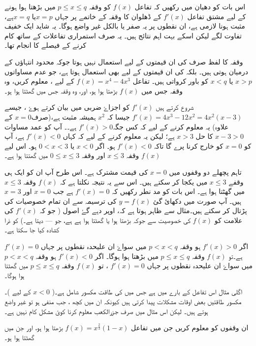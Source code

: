 اس بات کو دھیان میں رکھیں کہ تفاعل  \(f(x)\) کو وقفہ \(p \leq x \leq q\) میں بڑھتا ہوا ہونے کے لیے مشتق تفاعل \(f'(x)\) کے ڈھلوان کا وقفہ کے خاتمے پر جہاں \(x=p\)یا \(x=q\)ہے، مثبت ہونا لازمی ہے، ان نقطوں پر یہ صفر یا بالکل غیر واضع ہوگا۔ یہ شاید ایک خفیف تفاوت لگے لیکن اسکے بہت اہم نتائج ہیں۔ یہ صرف استمراری تفاعلات کے ساتھ کام کرنے کے فیصلے کا انجام تھا۔

وقفہ کا لفظ صرف   کی ان قیمتوں کے لیے استعمال نہیں ہوتا جوکہ محدود انتہاؤں کے درمیان ہوتی ہیں۔ بلکہ   کی ان قیمتوں کے لیے بھی استعمال ہوتا ہے، جو عدم مساواتوں \(x>p\) یا \(x<q\) کو باور کرواتی ہیں۔
تفاعل \(f(x)=x^4-4x^3\) کے لیے ، معلوم کریں، وہ وقفہ جس میں  \(f(x)\)  بڑھتا ہوا ہو، اور، وہ وقفہ جس میں گھٹتا ہوا ہو۔

شروع کرتے ہیں \(f'(x)\) کو اجزاۓ ضربی میں بیان کرتے ہوۓ ، جیسے \(f'(x)=4x^3-12x^2=4x^2(x-3)\) جیسا کہ \(x^2\) ہمیشہ مثبت ہے،(صرف\(x=0\) کے علاوہ) یہ معلوم کرنے کے لیے کہ کس جگہ\(f'(x)>0\) ہے۔۔ آپ کو عمد مساوات \(x-3>0\) کا حل \(x>3\) ہے؛ لیکن یہ معلوم کرنے کے لیے کہ کہاں \(f'(x)<0\) ہے، آپ کو \(x=0\) کو خارج کرنا پرے گا تاکہ \(f'(x)<0\) ہو۔ اگر \(x<0\) یا \(0<x<3\) ہو۔ اس لیے \(f(x)\)  وقفہ \(x \leq 3\) اور وقفہ \(0 \leq x \leq 3\) میں گھتتا ہوا ہے۔

تاہم پچھلے دو وقفوں میں \(x=0\) کی قیمت مشترک ہے۔ اس طرح آپ ان کو ایک ہی وقفے \(x \leq 3\) میں یکجا کر سکتے ہیں۔ اس سے یہ نتیجہ نکلتا ہے کہ \(f(x)\) وقفہ \(x \leq 3\) میں گھٹتا ہوا ہے۔
اس بات کو مد نطر رکھیں  کہ \(f'(x)=0\) ہے جب \(x=0\) اور \(x=3\) ہیں۔ آپ صورت   میں دکھائ گئ \(y=f(x)\) کی ترسیمہ سے ان تمام خصوصیات کی پڑتال کر سکتے ہیں۔مثال   سے ظاہر ہوتا ہے کہ، اوپر دہے گۓ اصول ( جو کہ \(f'(x)\) کی علامت کو    \(f(x)\)  کی خصوصیت سے جوکہ بڑھتا ہوا یا گھٹتا ہوا ہے ہے،  جو --- دیتا ہے۔) کو ذرا کشادہ کیا جا سکتا ہے۔

اگر \(f'(x)>0\) ہو وقفہ \(p<x<q\)  میں سواۓ ان علیحدہ نقطوں پر جہاں \(f'(x)=0\) ہے۔تو     \(f(x)\) وقفہ \(p \leq x \leq q\) میں بڑھتا ہوا ہوگا۔ اگر \(f'(x)<0\) ہو وقفہ \(p<x<q\) میں سواۓ ان علیحدہ نقطوں پر جہاں \(f'(x)=0\) ، تو \(f(x)\) وقفہ \(p \leq x \leq q\) میں گھٹتا ہوا ہوگا۔

اگلی مثال اس تفاعل کے بارے میں ہے جس میں    کی طاقت مکسور شامل ہے۔( \(x<0\) کے لیے )۔ مکسور طاقتیں بعض اوقات مشکلات پیدا کرتی ہیں کیونکہ ان میں کچھ ، جب  منفی ہو تو غیر واضع ہوتے ہیں۔ لیکن اس مثال میں صرف جزرالکعب معلوم کرنا کوئ مشکل کام نہیں ہے۔

ان وقفوں کو معلوم کریں جن میں تفاعل \(f(x)=x^{\frac{2}{3}}(1-x)\) بڑھتا ہوا ہو، اور جن میں گھٹتا ہوا ہو۔ 

